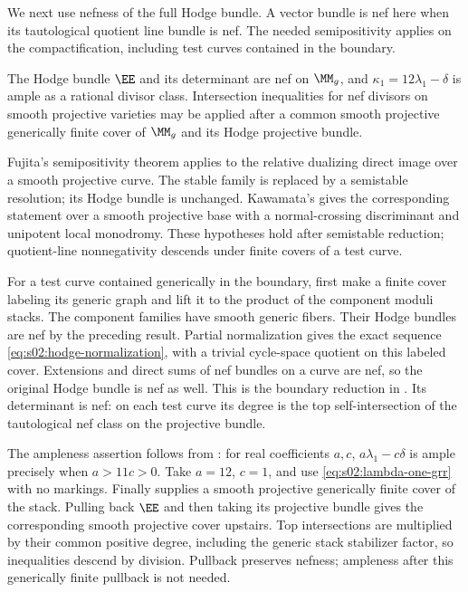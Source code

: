We next use nefness of the full Hodge bundle. A vector bundle is
nef here when its tautological quotient line bundle is nef.
The needed semipositivity applies on the compactification, including
test curves contained in the boundary.

\begin{lmm}\label{lmm:s08:nef}
The Hodge bundle $\EE$ and its determinant are nef on $\MM_g$,
and $\kappa_1=12\lambda_1-\delta$ is ample as a rational divisor
class. Intersection inequalities for nef divisors on smooth
projective varieties may be applied after a common smooth
projective generically finite cover of $\MM_g$ and its Hodge
projective bundle.
\end{lmm}
\begin{prf}
Fujita's semipositivity theorem \cite[Main Theorem (0.6)]{Fuj78}
applies to the relative dualizing direct image over a smooth
projective curve. The stable family is replaced by a semistable
resolution; its Hodge bundle is unchanged. Kawamata's
\cite[Theorem 5]{Kaw81} gives the corresponding statement over a
smooth projective base with a normal-crossing discriminant and
unipotent local monodromy. These hypotheses hold after semistable
reduction; quotient-line nonnegativity descends under finite
covers of a test curve.

For a test curve contained generically in the boundary, first make
a finite cover labeling its generic graph and lift it to the
product of the component moduli stacks. The component families
have smooth generic fibers. Their Hodge bundles are nef by the
preceding result. Partial normalization gives the exact sequence
\eqref{eq:s02:hodge-normalization}, with a trivial cycle-space
quotient on this labeled cover. Extensions and direct sums of nef
bundles on a curve are nef, so the original Hodge bundle is nef as
well. This is the boundary reduction in
\cite[Proposition 4.4]{LX26b}. Its determinant is nef: on each
test curve its degree is the top self-intersection of the
tautological nef class on the projective bundle.

The ampleness assertion follows from
\cite[Theorem (1.3)]{CH88}: for real coefficients $a,c$,
$a\lambda_1-c\delta$ is ample precisely when $a>11c>0$.
Take $a=12$, $c=1$, and use
\eqref{eq:s02:lambda-one-grr} with no markings.
Finally \cite[Proposition 6.1, $m=0$]{LX26b} supplies a smooth
projective generically finite cover of the stack. Pulling back
$\EE$ and then taking its projective bundle gives the corresponding
smooth projective cover upstairs. Top intersections are multiplied
by their common positive degree, including the generic stack
stabilizer factor, so inequalities descend by division. Pullback
preserves nefness; ampleness after this generically finite
pullback is not needed.
\end{prf}


